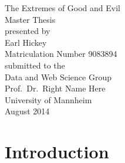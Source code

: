 \documentclass[11pt,titlepage,oneside,openany]{book}
\begin{document}
\begin{titlepage}
	\vspace*{2cm}
  \begin{center}
   {\Large The Extremes of Good and Evil\\}
   \vspace{2cm} 
   {Master Thesis\\}
   \vspace{2cm}
   {presented by\\
    Earl Hickey \\
    Matriculation Number 9083894\\
   }
   \vspace{1cm} 
   {submitted to the\\
    Data and Web Science Group\\
    Prof.\ Dr.\ Right Name Here\\
    University of Mannheim\\} \vspace{2cm}
   {August 2014}
  \end{center}
\end{titlepage} 

\tableofcontents
\newpage

\listofalgorithms

\listoffigures

\listoftables


\newpage



\chapter{Introduction}
\end{document}
